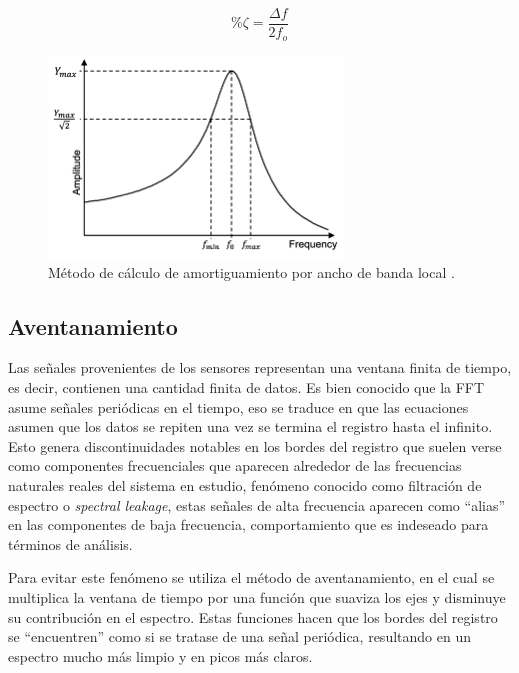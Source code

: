 \begin{itemize}
    \begin{equation}
        \%\zeta = \frac{\Delta f}{2f_o}
    \end{equation}
    
    \begin{figure}[H]
        \centering
        \includegraphics[width = 0.7\textwidth]{imagenes/cap1_marcoteo/Half-power-bandwidth-method.png}
        \caption{Método de cálculo de amortiguamiento por ancho de banda local \citep{potenciamitad2019}.}
        \label{fig:potenciamitad}
    \end{figure}
\end{itemize}


\subsection{Aventanamiento} Las señales provenientes de los sensores representan una ventana finita de tiempo, es decir, contienen una cantidad finita de datos. Es bien conocido que la FFT asume señales periódicas en el tiempo, eso se traduce en que las ecuaciones asumen que los datos se repiten una vez se termina el registro hasta el infinito. Esto genera discontinuidades notables en los bordes del registro que suelen verse como componentes frecuenciales que aparecen alrededor de las frecuencias naturales reales del sistema en estudio, fenómeno conocido como filtración de espectro o \textit{spectral leakage}, estas señales de alta frecuencia aparecen como ``alias'' en las componentes de baja frecuencia, comportamiento que es indeseado para términos de análisis.

Para evitar este fenómeno se utiliza el método de aventanamiento, en el cual se multiplica la ventana de tiempo por una función que suaviza los ejes y disminuye su contribución en el espectro. Estas funciones hacen que los bordes del registro se ``encuentren'' como si se tratase de una señal periódica, resultando en un espectro mucho más limpio y en picos más claros.


